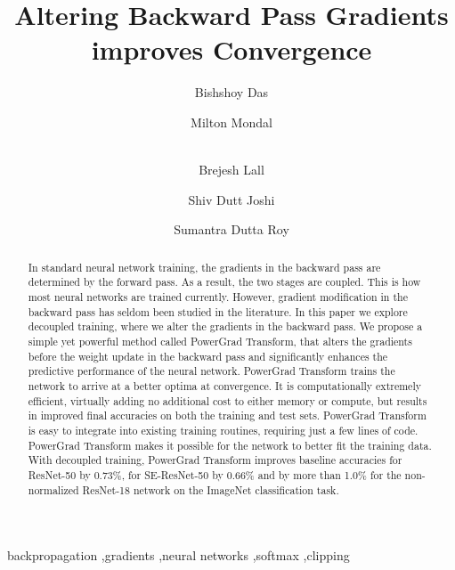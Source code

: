 \documentclass[times,sort&compress]{elsarticle}
\begin{document}
\begin{frontmatter}

\title{Altering Backward Pass Gradients improves Convergence}

\author[1]{Bishshoy Das}

\author[1]{Milton Mondal}

\author[1]{\\ Brejesh Lall}

\author[1]{Shiv Dutt Joshi}

\author[1]{Sumantra Dutta Roy}


\address[1]{Electrical Engineering Department, Indian Institute of Technology Delhi, Hauz Khas, New Delhi - 110016, India}



\begin{abstract}
In standard neural network training, the gradients in the backward pass are determined
by the forward pass. As a result, the two stages are coupled. This is how most neural
networks are trained currently. However, gradient modification in the backward pass has
seldom been studied in the literature. In this paper we explore decoupled training,
where we alter the gradients in the backward pass. We propose a simple yet powerful
method called PowerGrad Transform, that alters the gradients before the weight update in
the backward pass and significantly enhances the predictive performance of the neural
network. PowerGrad Transform trains the network to arrive at a better optima at
convergence. It is computationally extremely efficient, virtually adding no additional
cost to either memory or compute, but results in improved final accuracies on both the
training and test sets. PowerGrad Transform is easy to integrate into existing training
routines, requiring just a few lines of code. PowerGrad Transform makes it possible for
the network to better fit the training data. With decoupled training, PowerGrad
Transform improves baseline accuracies for ResNet-50 by 0.73\%, for SE-ResNet-50 by
0.66\% and by more than 1.0\% for the non-normalized ResNet-18 network on the ImageNet
classification task.
\end{abstract}

\begin{keyword}
\KWD backpropagation \sep gradients \sep neural networks \sep softmax \sep clipping
\end{keyword}

\end{frontmatter}
\end{document}
